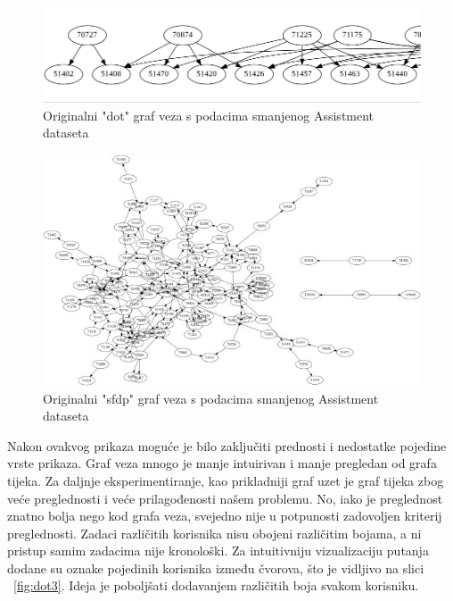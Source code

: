 \documentclass[times, utf8,projekt]{fer}
\begin{document}
\begin{figure}[!htb]
\centering
\includegraphics[scale=0.4]{dot2.png}
\caption{Originalni "dot" graf veza s podacima smanjenog Assistment dataseta}
\label{fig:dot2}
\end{figure}

\begin{figure}[!htb]
\centering
\includegraphics[scale=2]{sfdp2.jpg}
\caption{Originalni "sfdp" graf veza s podacima smanjenog Assistment dataseta}
\label{fig:sfdp2}
\end{figure}

\noindent Nakon ovakvog prikaza moguće je bilo zaključiti prednosti i nedostatke pojedine vrste prikaza.\newline
Graf veza mnogo je manje intuirivan i manje pregledan od grafa tijeka. Za daljnje eksperimentiranje, kao prikladniji graf uzet je graf tijeka zbog veće preglednosti i veće prilagođenosti našem problemu. No, iako je preglednost znatno bolja nego kod grafa veza, svejedno nije u potpunosti zadovoljen kriterij preglednosti. Zadaci različitih korisnika nisu obojeni različitim bojama, a ni pristup samim zadacima nije kronološki.\newline
Za intuitivniju vizualizaciju putanja dodane su oznake pojedinih korisnika između čvorova, što je vidljivo na slici ~\ref{fig:dot3}. Ideja je poboljšati dodavanjem različitih boja svakom korisniku. 
\end{document}
